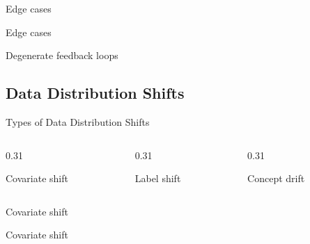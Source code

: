\begin{frame}{Edge cases}
  \begin{withmargin}
    \begin{tdmain}
      \begin{tddef}{Edge cases}
      \end{tddef}
    \end{tdmain}
    \begin{tdmargin}
    \end{tdmargin}
  \end{withmargin}
\end{frame}

\begin{frame}{Degenerate feedback loops}
  \begin{sidebody}
  \end{sidebody}
\end{frame}

\subsection{Data Distribution Shifts}

\begin{frame}{Types of Data Distribution Shifts}
  \begin{columns}[T,onlytextwidth]
    \begin{column}{0.31\textwidth}
      \begin{tdblockt}[equal height group=types]{Covariate shift}
      \end{tdblockt}
    \end{column}
    \begin{column}{0.31\textwidth}
      \begin{tdblockt}[equal height group=types]{Label shift}
      \end{tdblockt}
    \end{column}
    \begin{column}{0.31\textwidth}
      \begin{tdblockt}[equal height group=types]{Concept drift}
      \end{tdblockt}
    \end{column}
  \end{columns}
\end{frame}

\begin{frame}{Covariate shift}
  \begin{tddef}{Covariate shift}
  \end{tddef}
\end{frame}


